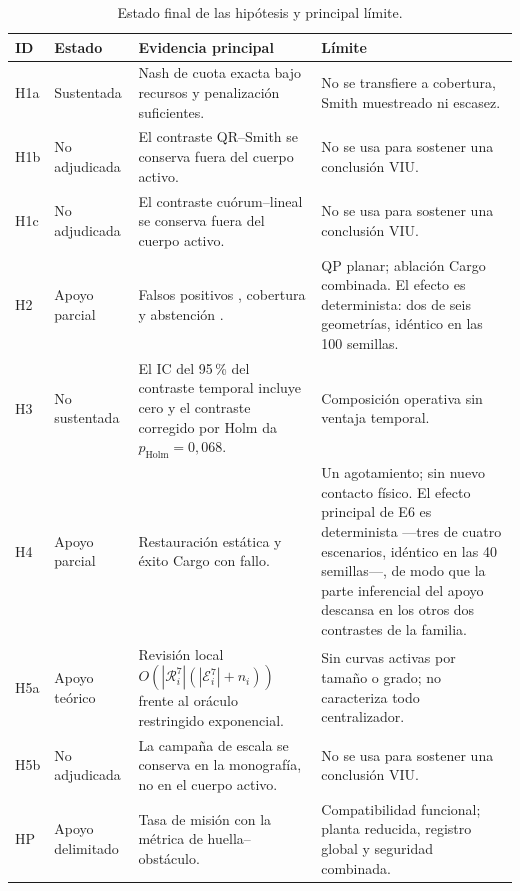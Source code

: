 \begin{table}[H]
  \centering
  \caption{Estado final de las hipótesis y principal límite.}
  \label{tab:conclusion-hypotheses}
  \scriptsize
  \setlength{\tabcolsep}{3pt}
  \begin{tabularx}{\textwidth}{@{}p{0.8cm}p{1.75cm}p{5.1cm}X@{}}
    \toprule
    ID & Estado & Evidencia principal & Límite \\
    \midrule
    H1a & Sustentada & Nash de cuota exacta bajo recursos y penalización suficientes. & No se transfiere a cobertura, Smith muestreado ni escasez. \\
    H1b & No adjudicada & El contraste QR--Smith se conserva fuera del cuerpo activo. & No se usa para sostener una conclusión VIU. \\
    H1c & No adjudicada & El contraste cuórum--lineal se conserva fuera del cuerpo activo. & No se usa para sostener una conclusión VIU. \\
    H2 & Apoyo parcial & Falsos positivos \SPThreeGuardEffect{}, cobertura \SPThreeGuardedCoverage{} y abstención \SPThreeGuardedAbstention{}. & QP planar; ablación Cargo combinada. El efecto es determinista: dos de seis geometrías, idéntico en las 100 semillas. \\
    H3 & No sustentada & El IC del 95\,\% del contraste temporal incluye cero y el contraste corregido por Holm da $p_{\mathrm{Holm}}=0{,}068$. & Composición operativa sin ventaja temporal. \\
    H4 & Apoyo parcial & Restauración estática \SPSixConditionalRestore{} y éxito Cargo \CargoEtwoEFailureSuccess{} con fallo. & Un agotamiento; sin nuevo contacto físico. El efecto principal de E6 es determinista ---tres de cuatro escenarios, idéntico en las 40 semillas---, de modo que la parte inferencial del apoyo descansa en los otros dos contrastes de la familia. \\
    H5a & Apoyo teórico & Revisión local $O(|\mathcal R_i^7|(|\mathcal E_i^7|+n_i))$ frente al oráculo restringido exponencial. & Sin curvas activas por tamaño o grado; no caracteriza todo centralizador. \\
    H5b & No adjudicada & La campaña de escala se conserva en la monografía, no en el cuerpo activo. & No se usa para sostener una conclusión VIU. \\
    HP & Apoyo delimitado & Tasa de misión \CargoEtwoESuccess{} con la métrica de huella--obstáculo. & Compatibilidad funcional; planta reducida, registro global y seguridad combinada. \\
    \bottomrule
  \end{tabularx}
  \viuownsource
\end{table}

